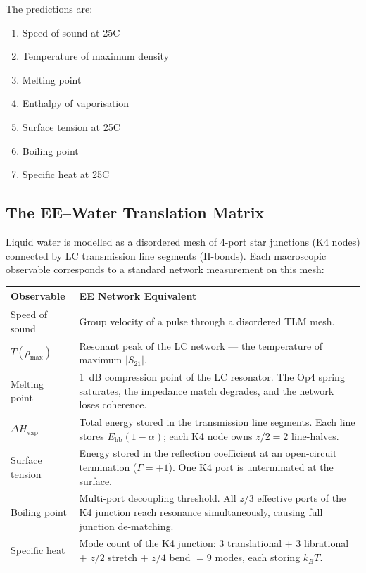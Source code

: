The predictions are:
\begin{enumerate}
    \item Speed of sound at 25\textdegree{}C
    \item Temperature of maximum density
    \item Melting point
    \item Enthalpy of vaporisation
    \item Surface tension at 25\textdegree{}C
    \item Boiling point
    \item Specific heat at 25\textdegree{}C
\end{enumerate}

\subsection{The EE--Water Translation Matrix}

Liquid water is modelled as a disordered mesh of 4-port star junctions (K4 nodes) connected by LC transmission line segments (H-bonds). Each macroscopic observable corresponds to a standard network measurement on this mesh:

\begin{center}
\renewcommand{\arraystretch}{1.4}
\small
\begin{tabular}{p{3.8cm} p{8.8cm}}
\toprule
\textbf{Observable} & \textbf{EE Network Equivalent} \\
\midrule
Speed of sound
    & Group velocity of a pulse through a disordered TLM mesh. \\
$T(\rho_\mathrm{max})$
    & Resonant peak of the LC network --- the temperature of maximum $|S_{21}|$.\\
Melting point
    & 1~dB compression point of the LC resonator. The Op4 spring saturates, the impedance match degrades, and the network loses coherence. \\
$\Delta H_\mathrm{vap}$
    & Total energy stored in the transmission line segments. Each line stores $E_\mathrm{hb}(1-\alpha)$; each K4 node owns $z/2 = 2$ line-halves. \\
Surface tension
    & Energy stored in the reflection coefficient at an open-circuit termination ($\Gamma = +1$\gammaundeclared{}). One K4 port is unterminated at the surface. \\
Boiling point
    & Multi-port decoupling threshold. All $z/3$ effective ports of the K4 junction reach resonance simultaneously, causing full junction de-matching. \\
Specific heat
    & Mode count of the K4 junction: 3 translational + 3 librational + $z/2$ stretch + $z/4$ bend $= 9$ modes, each storing $k_B T$.  \\
\bottomrule
\end{tabular}
\end{center}

